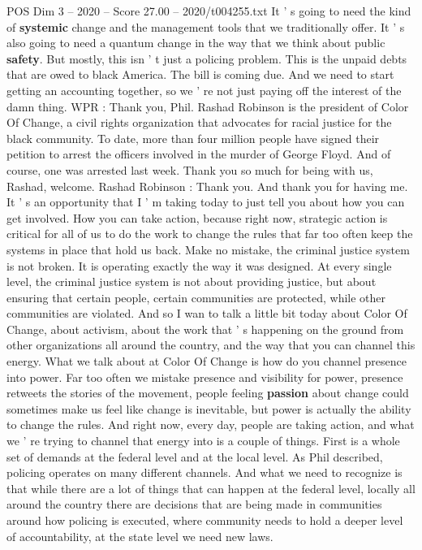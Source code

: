 \begin{textsample}{POS Dim 3 – 2020 – Score 27.00 – 2020/t004255.txt}
It ' s going to need the kind of \textbf{systemic} change and the management tools that we traditionally offer.
It ' s also going to need a quantum change in the way that we think about public \textbf{safety}.
But mostly, this isn ' t just a policing problem.
This is the unpaid debts that are owed to black America.
The bill is coming due.
And we need to start getting an accounting together, so we ' re not just paying off the interest of the damn thing.
WPR : Thank you, Phil.
Rashad Robinson is the president of Color Of Change, a civil rights organization that advocates for racial justice for the black community.
To date, more than four million people have signed their petition to arrest the officers involved in the murder of George Floyd.
And of course, one was arrested last week.
Thank you so much for being with us, Rashad, welcome.
Rashad Robinson : Thank you.
And thank you for having me.
It ' s an opportunity that I ' m taking today to just tell you about how you can get involved.
How you can take action, because right now, strategic action is critical for all of us to do the work to change the rules that far too often keep the systems in place that hold us back.
Make no mistake, the criminal justice system is not broken.
It is operating exactly the way it was designed.
At every single level, the criminal justice system is not about providing justice, but about ensuring that certain people, certain communities are protected, while other communities are violated.
And so I wan to talk a little bit today about Color Of Change, about activism, about the work that ' s happening on the ground from other organizations all around the country, and the way that you can channel this energy.
What we talk about at Color Of Change is how do you channel presence into power.
Far too often we mistake presence and visibility for power, presence retweets the stories of the movement, people feeling \textbf{passion} about change could sometimes make us feel like change is inevitable, but power is actually the ability to change the rules.
And right now, every day, people are taking action, and what we ' re trying to channel that energy into is a couple of things.
First is a whole set of demands at the federal level and at the local level.
As Phil described, policing operates on many different channels.
And what we need to recognize is that while there are a lot of things that can happen at the federal level, locally all around the country there are decisions that are being made in communities around how policing is executed, where community needs to hold a deeper level of accountability, at the state level we need new laws.

\end{textsample}
